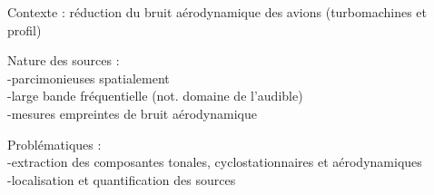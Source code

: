 \begin{frame}
	
	Contexte : réduction du bruit aérodynamique des avions (turbomachines et profil)
	
	Nature des sources : \\
	-parcimonieuses spatialement\\
	-large bande fréquentielle (not. domaine de l'audible)\\
	-mesures empreintes de bruit aérodynamique
	
	
\end{frame}

\begin{frame}
	
	Problématiques : \\
	-extraction des composantes tonales, cyclostationnaires et aérodynamiques\\
	-localisation et quantification des sources
	

	
\end{frame}

